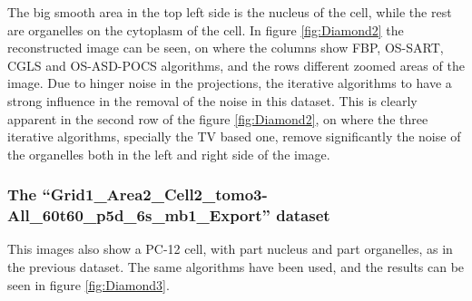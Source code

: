  The big smooth area in the top left side is the nucleus of the cell, while the rest are organelles on the cytoplasm of the cell.  In figure \ref{fig:Diamond2} the reconstructed image can be seen, on where the columns show FBP, OS-SART, CGLS and OS-ASD-POCS algorithms, and the rows different zoomed areas of the image. Due to hinger noise in the projections, the iterative algorithms to have a strong influence in the removal of the noise in this dataset. This is clearly apparent in the second row of the figure \ref{fig:Diamond2}, on where the three iterative algorithms, specially the TV based one, remove significantly the noise of the organelles both in the left and right side of the image. 

\subsubsection{The ``Grid1\_Area2\_Cell2\_tomo3-All\_60t60\_p5d\_6s\_mb1\_Export'' dataset}
This images also show a PC-12 cell, with part nucleus and part organelles, as in the previous dataset. The same algorithms have been used, and the results can be seen in figure \ref{fig:Diamond3}.
